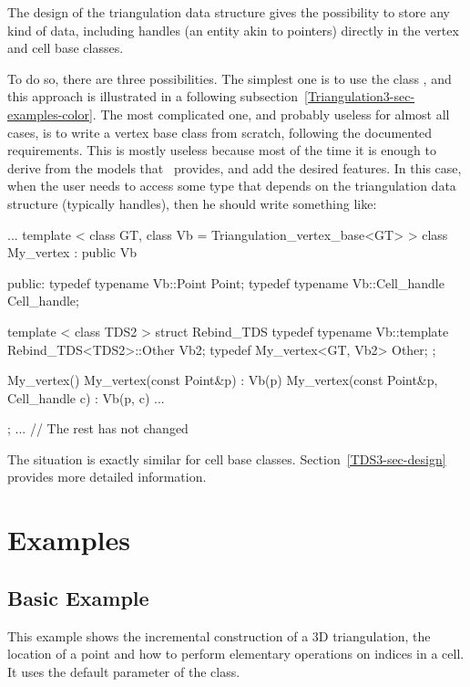 The design of the triangulation data structure gives the possibility to store
any kind of data, including handles (an entity akin to pointers) directly in
the vertex and cell base classes.

To do so, there are three possibilities.  The simplest one is to use the
class , and this approach is
illustrated in a following subsection~\ref{Triangulation3-sec-examples-color}.
The most complicated one, and probably useless for almost all cases, is to
write a vertex base class from scratch, following the documented requirements.
This is mostly useless because most of the time it is enough to derive from
the models that \cgal\ provides, and add the desired features.
In this case, when the user needs to access some type that depends on the
triangulation data structure (typically handles), then he should write
something like:
\begin{ccExampleCode}
...
template < class GT, class Vb = Triangulation_vertex_base<GT> >
class My_vertex
  : public Vb
{
public:
  typedef typename Vb::Point           Point;
  typedef typename Vb::Cell_handle     Cell_handle;

  template < class TDS2 >
  struct Rebind_TDS {
    typedef typename Vb::template Rebind_TDS<TDS2>::Other  Vb2;
    typedef My_vertex<GT, Vb2>                             Other;
  };

  My_vertex() {}
  My_vertex(const Point&p)                : Vb(p) {}
  My_vertex(const Point&p, Cell_handle c) : Vb(p, c) {}
...
};
... // The rest has not changed
\end{ccExampleCode}

The situation is exactly similar for cell base classes.
Section~\ref{TDS3-sec-design} provides more detailed information.


\section{Examples\label{Triangulation3-sec-examples}}
\subsection{Basic Example}
This example shows the incremental construction of a 3D triangulation, the
location of a point and how to perform elementary operations on indices in a
cell. It uses the default parameter of the  class.


